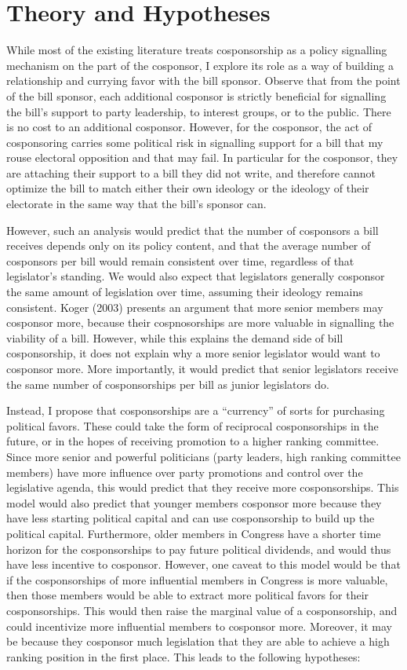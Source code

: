 \documentclass{article}
\begin{document}
\section{Theory and Hypotheses}
While most of the existing literature treats cosponsorship as a policy signalling mechanism on the part of the cosponsor, I explore its role as a way of building a relationship and currying favor with the bill sponsor. Observe that from the point of the bill sponsor, each additional cosponsor is strictly beneficial for signalling the bill's support to party leadership, to interest groups, or to the public. There is no cost to an additional cosponsor. However, for the cosponsor, the act of cosponsoring carries some political risk in signalling support for a bill that my rouse electoral opposition and that may fail. In particular for the cosponsor, they are attaching their support to a bill they did not write, and therefore cannot optimize the bill to match either their own ideology or the ideology of their electorate in the same way that the bill's sponsor can. 

However, such an analysis would predict that the number of cosponsors a bill receives depends only on its policy content, and that the average number of cosponsors per bill would remain consistent over time, regardless of that legislator's standing. We would also expect that legislators generally cosponsor the same amount of legislation over time, assuming their ideology remains consistent. Koger (2003) \cite{koger2003} presents an argument that more senior members may cosponsor more, because their cospnosorships are more valuable in signalling the viability of a bill. However, while this explains the demand side of bill cosponsorship, it does not explain why a more senior legislator would want to cosponsor more. More importantly, it would predict that senior legislators receive the same number of cosponsorships per bill as junior legislators do.

Instead, I propose that cosponsorships are a ``currency'' of sorts for purchasing political favors. These could take the form of reciprocal cosponsorships in the future, or in the hopes of receiving promotion to a higher ranking committee. Since more senior and powerful politicians (party leaders, high ranking committee members) have more influence over party promotions and control over the legislative agenda, this would predict that they receive more cosponsorships. This model would also predict that younger members cosponsor more because they have less starting political capital and can use cosponsorship to build up the political capital. Furthermore, older members in Congress have a shorter time horizon for the cosponsorships to pay future political dividends, and would thus have less incentive to cosponsor. However, one caveat to this model would be that if the cosponsorships of more influential members in Congress is more valuable, then those members would be able to extract more political favors for their cosponsorships. This would then raise the marginal value of a cosponsorship, and could incentivize more influential members to cosponsor more. Moreover, it may be because they cosponsor much legislation that they are able to achieve a high ranking position in the first place. This leads to the following hypotheses:
\end{document}
